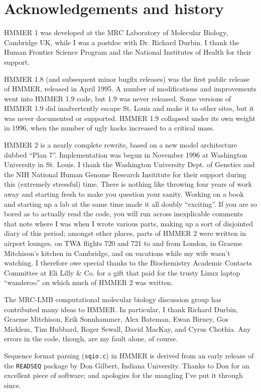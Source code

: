 \chapter {Acknowledgements and history}

HMMER 1 was developed at the MRC Laboratory of Molecular Biology,
Cambridge UK, while I was a postdoc with Dr. Richard Durbin. I thank
the Human Frontier Science Program and the National Institutes of
Health for their support. 

HMMER 1.8 (and subsequent minor bugfix releases) was the first public
release of HMMER, released in April 1995. A number of modifications
and improvements went into HMMER 1.9 code, but 1.9 was never
released. Some versions of HMMER 1.9 did inadvertently escape
St. Louis and make it to other sites, but it was never documented or
supported. HMMER 1.9 collapsed under its own weight in 1996, when the
number of ugly hacks increased to a critical mass.

HMMER 2 is a nearly complete rewrite, based on a new model
architecture dubbed ``Plan 7''. Implementation was begun in November
1996 at Washington University in St. Louis. I thank the Washington
University Dept. of Genetics and the NIH National Human Genome
Research Insititute for their support during this (extremely
stressful) time. There is nothing like throwing four years of work
away and starting fresh to make you question your sanity. Working on a
book \cite{Durbin98} and starting up a lab at the same time made it
all doubly ``exciting''. If you are so bored as to actually read the
code, you will run across inexplicable comments that note where I was
when I wrote various parts, making up a sort of disjointed diary of
this period; amongst other places, parts of HMMER 2 were written in
airport lounges, on TWA flights 720 and 721 to and from London, in
Graeme Mitchison's kitchen in Cambridge, and on vacations while my
wife wasn't watching. I therefore owe special thanks to the
Biochemistry Academic Contacts Committee at Eli Lilly \& Co. for a
gift that paid for the trusty Linux laptop ``wanderoo'' on which much
of HMMER 2 was written.

The MRC-LMB computational molecular biology discussion group has
contributed many ideas to HMMER. In particular, I thank Richard
Durbin, Graeme Mitchison, Erik Sonnhammer, Alex Bateman, Ewan Birney,
Gos Micklem, Tim Hubbard, Roger Sewall, David MacKay, and Cyrus
Chothia. Any errors in the code, though, are my fault alone, of
course.

Sequence format parsing ({\tt sqio.c}) in HMMER is derived from an
early release of the {\tt READSEQ} package by Don Gilbert, Indiana
University. Thanks to Don for an excellent piece of software; and
apologies for the mangling I've put it through since. 

